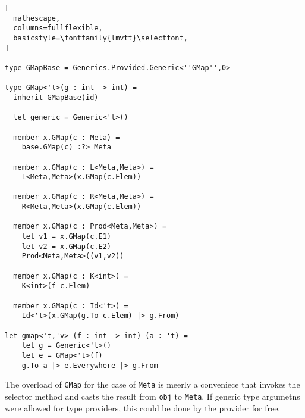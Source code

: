 \documentclass[8pt]{extarticle}
\begin{document}
\begin{lstlisting}[
  mathescape,
  columns=fullflexible,
  basicstyle=\fontfamily{lmvtt}\selectfont,
]

type GMapBase = Generics.Provided.Generic<''GMap'',0>

type GMap<'t>(g : int -> int) =
  inherit GMapBase(id)

  let generic = Generic<'t>()

  member x.GMap(c : Meta) =
    base.GMap(c) :?> Meta

  member x.GMap(c : L<Meta,Meta>) =
    L<Meta,Meta>(x.GMap(c.Elem))

  member x.GMap(c : R<Meta,Meta>) = 
    R<Meta,Meta>(x.GMap(c.Elem))

  member x.GMap(c : Prod<Meta,Meta>) =
    let v1 = x.GMap(c.E1)
    let v2 = x.GMap(c.E2)
    Prod<Meta,Meta>((v1,v2))

  member x.GMap(c : K<int>) =
    K<int>(f c.Elem)

  member x.GMap(c : Id<'t>) =
    Id<'t>(x.GMap(g.To c.Elem) |> g.From)
  
let gmap<'t,'v> (f : int -> int) (a : 't) =
    let g = Generic<'t>()
    let e = GMap<'t>(f)
    g.To a |> e.Everywhere |> g.From

\end{lstlisting}
The overload of \verb+GMap+ for the case of \verb+Meta+ is meerly a conveniece that invokes the selector method and casts the result from \verb+obj+ to \verb+Meta+. If generic type argumetns were allowed for type providers, this could be done by the provider for free.
\end{document}
